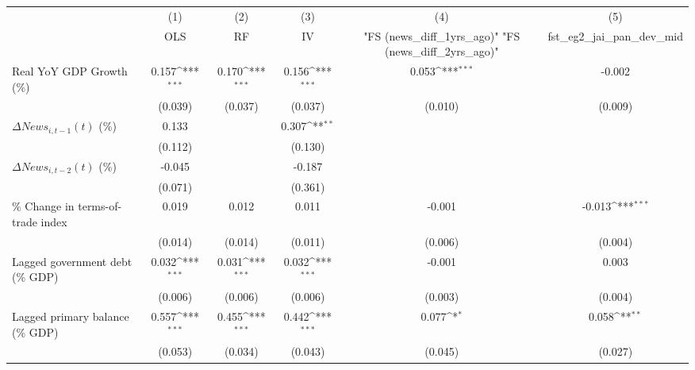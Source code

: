 {
\def\sym#1{\ifmmode^{#1}\else\(^{#1}\)\fi}
\begin{tabular}{l*{5}{c}}
\toprule
                    &\multicolumn{1}{c}{(1)}&\multicolumn{1}{c}{(2)}&\multicolumn{1}{c}{(3)}&\multicolumn{1}{c}{(4)}&\multicolumn{1}{c}{(5)}\\
                    &\multicolumn{1}{c}{OLS}&\multicolumn{1}{c}{RF}&\multicolumn{1}{c}{IV}&\multicolumn{1}{c}{ "FS (news_diff_1yrs_ago)"  "FS (news_diff_2yrs_ago)" }&\multicolumn{1}{c}{fst_eg2_jai_pan_dev_mid}\\
\midrule
Real YoY GDP Growth (\%)&       0.157\sym{***}&       0.170\sym{***}&       0.156\sym{***}&       0.053\sym{***}&      -0.002         \\
                    &     (0.039)         &     (0.037)         &     (0.037)         &     (0.010)         &     (0.009)         \\
\addlinespace
$ \Delta News_{i,t-1}(t)$ (\%)&       0.133         &                     &       0.307\sym{**} &                     &                     \\
                    &     (0.112)         &                     &     (0.130)         &                     &                     \\
\addlinespace
$ \Delta News_{i,t-2}(t)$ (\%)&      -0.045         &                     &      -0.187         &                     &                     \\
                    &     (0.071)         &                     &     (0.361)         &                     &                     \\
\addlinespace
\% Change in terms-of-trade index&       0.019         &       0.012         &       0.011         &      -0.001         &      -0.013\sym{***}\\
                    &     (0.014)         &     (0.014)         &     (0.011)         &     (0.006)         &     (0.004)         \\
\addlinespace
Lagged government debt (\% GDP)&       0.032\sym{***}&       0.031\sym{***}&       0.032\sym{***}&      -0.001         &       0.003         \\
                    &     (0.006)         &     (0.006)         &     (0.006)         &     (0.003)         &     (0.004)         \\
\addlinespace
Lagged primary balance (\% GDP)&       0.557\sym{***}&       0.455\sym{***}&       0.442\sym{***}&       0.077\sym{*}  &       0.058\sym{**} \\
                    &     (0.053)         &     (0.034)         &     (0.043)         &     (0.045)         &     (0.027)         \\

\end{tabular}}
